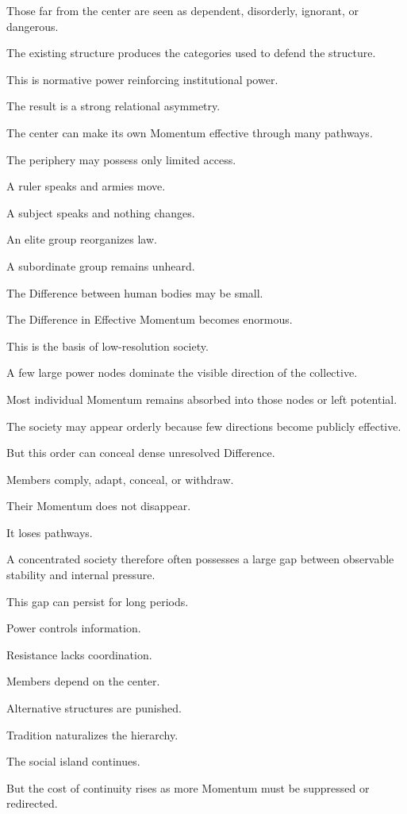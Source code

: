 Those far from the center are seen as dependent, disorderly, ignorant, or dangerous.

The existing structure produces the categories used to defend the structure.

This is normative power reinforcing institutional power.

The result is a strong relational asymmetry.

The center can make its own Momentum effective through many pathways.

The periphery may possess only limited access.

A ruler speaks and armies move.

A subject speaks and nothing changes.

An elite group reorganizes law.

A subordinate group remains unheard.

The Difference between human bodies may be small.

The Difference in Effective Momentum becomes enormous.

This is the basis of low-resolution society.

A few large power nodes dominate the visible direction of the collective.

Most individual Momentum remains absorbed into those nodes or left potential.

The society may appear orderly because few directions become publicly effective.

But this order can conceal dense unresolved Difference.

Members comply, adapt, conceal, or withdraw.

Their Momentum does not disappear.

It loses pathways.

A concentrated society therefore often possesses a large gap between observable stability and internal pressure.

This gap can persist for long periods.

Power controls information.

Resistance lacks coordination.

Members depend on the center.

Alternative structures are punished.

Tradition naturalizes the hierarchy.

The social island continues.

But the cost of continuity rises as more Momentum must be suppressed or redirected.

